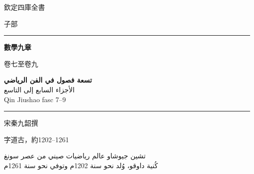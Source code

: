 \documentclass[11pt,a4paper]{article}
\begin{document}
\begin{titlepage}
\begin{center}
\vspace*{1.5cm}

{\fontsize{12}{16}\selectfont 欽定四庫全書}

\vspace{0.8cm}

{\fontsize{10}{14}\selectfont 子部}

\vspace{1.5cm}

\rule{0.85\textwidth}{1.5pt}

\vspace{0.8cm}

{\fontsize{26}{34}\selectfont\bfseries\color{titlecolor} 數學九章}

\vspace{0.4cm}

{\fontsize{14}{20}\selectfont\color{notecolor} 卷七至卷九}

\vspace{0.6cm}

{\fontsize{18}{24}\selectfont\arabicfont\beginR\color{titlecolor}
\textbf{تسعة فصول في الفن الرياضي}\\[0.3cm]
{\large الأجزاء السابع إلى التاسع}\\[0.2cm]
{\normalsize Qin Jiushao fasc 7--9}\endR}

\vspace{0.8cm}

\rule{0.85\textwidth}{1.5pt}

\vspace{1.5cm}

{\fontsize{12}{16}\selectfont 宋\quad 秦九韶\quad 撰}

\vspace{0.3cm}

{\fontsize{10}{14}\selectfont\color{notecolor} 字道古，約1202--1261}

\vspace{0.8cm}

{\fontsize{11}{15}\selectfont\arabicfont\beginR\color{notecolor}
تشين جيوشاو \textbullet{} عالم رياضيات صيني من عصر سونغ\\
كُنية داوقو، وُلد نحو سنة 1202م وتوفي نحو سنة 1261م
\endR}

\vspace{1.5cm}


\end{center}
\end{titlepage}
\end{document}
